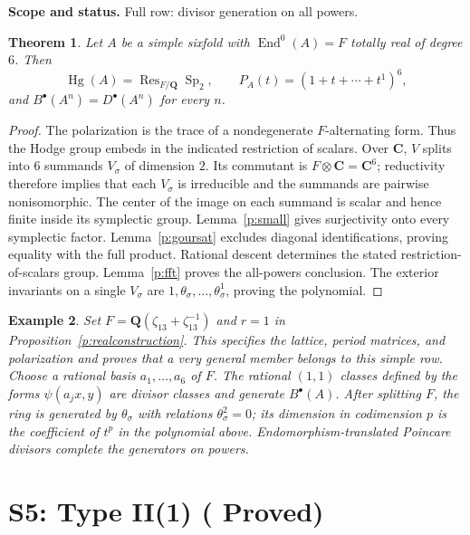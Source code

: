 \documentclass[11pt,reqno]{article}
\theoremstyle{emphasizedplain}
\DeclareRobustCommand{\provedstatus}{%
  \texorpdfstring{\textcolor{ProvedGreen}{\textbf{Proved}}}{Proved}}
\newtheorem{theorem}{Theorem}[section]
\theoremstyle{emphasizeddefinition}
\newtheorem{example}[theorem]{Example}
\theoremstyle{emphasizeddefinition}
\DeclareMathOperator{\End}{End}
\DeclareMathOperator{\Hg}{Hg}
\DeclareMathOperator{\Sp}{Sp}
\DeclareMathOperator{\Res}{Res}
\newcommand{\Q}{\mathbf Q}
\newcommand{\C}{\mathbf C}
\newcommand{\B}{B}
\newcommand{\D}{D}
\newcommand{\status}[1]{%
  \par\nobreak\smallskip\noindent
  {\setlength{\fboxsep}{7pt}%
   \colorbox{ScopeBackground}{%
    \parbox{\dimexpr\linewidth-2\fboxsep\relax}{%
     \small\textbf{\textcolor{HeadingInk}{Scope and status.}} #1}}}%
  \par\nobreak\medskip}
\begin{document}
\status{Full row: divisor generation on all powers.}
\begin{theorem}
Let $A$ be a simple sixfold with $\End^0(A)=F$ totally real of degree $6$.
Then
\[
 \Hg(A)=\Res_{F/\Q}\Sp_{2},\qquad
 P_A(t)=(1+t+\cdots+t^{1})^{6},
\]
and $\B^\bullet(A^n)=\D^\bullet(A^n)$ for every $n$.
\end{theorem}
\begin{proof}
The polarization is the trace of a nondegenerate $F$-alternating form.
Thus the Hodge group embeds in the indicated restriction of scalars.
Over $\C$, $V$ splits into $6$ summands $V_\sigma$ of dimension $2$.
Its commutant is $F\otimes\C=\C^{6}$; reductivity therefore implies that
each $V_\sigma$ is irreducible and the summands are pairwise nonisomorphic.
The center of the image on each summand is scalar and hence finite inside
its symplectic group. Lemma~\ref{p:small} gives surjectivity onto every
symplectic factor. Lemma~\ref{p:goursat} excludes diagonal identifications,
proving equality with the full product. Rational descent determines the
stated restriction-of-scalars group. Lemma~\ref{p:fft} proves the all-powers
conclusion. The exterior invariants on a single $V_\sigma$ are
$1,\theta_\sigma,\ldots,\theta_\sigma^{1}$, proving the polynomial.
\end{proof}
\begin{example}
Set $F=\Q(\zeta_{13}+\zeta_{13}^{-1})$ and $r=1$ in
Proposition~\ref{p:realconstruction}. This specifies the lattice, period
matrices, and polarization and proves that a very general member belongs
to this simple row. Choose a rational basis $a_1,\ldots,a_{6}$ of $F$.
The rational $(1,1)$ classes defined by the forms
$\psi(a_jx,y)$ are divisor classes and generate $\B^\bullet(A)$.
After splitting $F$, the ring is generated by $\theta_\sigma$ with
relations $\theta_\sigma^{2}=0$; its dimension in codimension $p$ is the
coefficient of $t^p$ in the polynomial above. Endomorphism-translated
Poincare divisors complete the generators on powers.
\end{example}
\section{S5: Type II(1) (\provedstatus)}\label{sec:S5}
\end{document}
